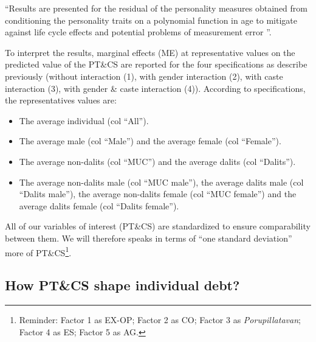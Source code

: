 \documentclass[a4paper, 11pt, onecolumn]{article}
\begin{document}

``Results are presented for the residual of the personality measures obtained from conditioning the personality traits on a polynomial function in age to mitigate against life cycle effects and potential problems of measurement error \citep{Brown2014}''.




To interpret the results, marginal effects (ME) at representative values on the predicted value of the PT\&CS are reported for the four specifications as describe previously (without interaction (1), with gender interaction (2), with caste interaction (3), with gender \& caste interaction (4)).
According to specifications, the representatives values are:
\begin{itemize}
\item[(1)] The average individual (col ``All'').
\item[(2)] The average male (col ``Male'') and the average female (col ``Female'').
\item[(3)] The average non-dalits (col ``MUC'') and the average dalits (col ``Dalits'').
\item[(4)] The average non-dalits male (col ``MUC male''), the average dalits male (col ``Dalits male''), the average non-dalits female (col ``MUC female'') and the average dalits female (col ``Dalits female'').
\end{itemize}
All of our variables of interest (PT\&CS) are standardized to ensure comparability between them.
We will therefore speaks in terms of ``one standard deviation'' more of PT\&CS\footnote{Reminder: Factor 1 as EX-OP; Factor 2 as CO; Factor 3 as \textit{Porupillatavan}; Factor 4 as ES; Factor 5 as AG.}.

\subsection{How PT\&CS shape individual debt?}
\end{document}

